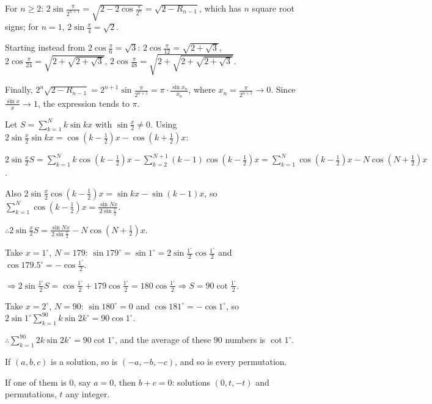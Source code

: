   For $n\geq 2$: $2\sin\frac{\pi}{2^{n + 1}} = \sqrt{2 - 2\cos\frac{\pi}{2^n}} = \sqrt{2 - R_{n - 1}}$, which has
  $n$ square root signs; for $n = 1$, $2\sin\frac{\pi}{4} = \sqrt{2}$.

  Starting instead from $2\cos\frac{\pi}{6} = \sqrt{3}$: $2\cos\frac{\pi}{12} = \sqrt{2 + \sqrt{3}}$,
  $2\cos\frac{\pi}{24} = \sqrt{2 + \sqrt{2 + \sqrt{3}}}$, $2\cos\frac{\pi}{48} = \sqrt{2 + \sqrt{2 + \sqrt{2 +
        \sqrt{3}}}}$.

  Finally, $2^n\sqrt{2 - R_{n - 1}} = 2^{n + 1}\sin\frac{\pi}{2^{n + 1}} = \pi\cdot\frac{\sin x_n}{x_n}$, where
  $x_n = \frac{\pi}{2^{n + 1}}\rightarrow 0$. Since $\frac{\sin x}{x}\rightarrow 1$, the expression tends to $\pi$.
\item Let $S = \displaystyle\sum_{k = 1}^{N}k\sin kx$ with $\sin\frac{x}{2}\neq 0$. Using $2\sin\frac{x}{2}\sin kx =
  \cos\left(k - \frac{1}{2}\right)x - \cos\left(k + \frac{1}{2}\right)x$:

  $2\sin\frac{x}{2}S = \displaystyle\sum_{k = 1}^{N}k\cos\left(k - \frac{1}{2}\right)x - \sum_{k = 2}^{N + 1}(k -
  1)\cos\left(k - \frac{1}{2}\right)x = \sum_{k = 1}^{N}\cos\left(k - \frac{1}{2}\right)x - N\cos\left(N
  + \frac{1}{2}\right)x$.

  Also $2\sin\frac{x}{2}\cos\left(k - \frac{1}{2}\right)x = \sin kx - \sin(k - 1)x$, so $\displaystyle\sum_{k =
    1}^{N}\cos\left(k - \frac{1}{2}\right)x = \frac{\sin Nx}{2\sin\frac{x}{2}}$.

  $\therefore 2\sin\frac{x}{2}S = \frac{\sin Nx}{2\sin\frac{x}{2}} - N\cos\left(N + \frac{1}{2}\right)x$.

  Take $x = 1^\circ$, $N = 179$: $\sin179^\circ = \sin1^\circ = 2\sin\frac{1^\circ}{2}\cos\frac{1^\circ}{2}$ and
  $\cos179.5^\circ = -\cos\frac{1^\circ}{2}$.

  $\Rightarrow 2\sin\frac{1^\circ}{2}S = \cos\frac{1^\circ}{2} + 179\cos\frac{1^\circ}{2} =
  180\cos\frac{1^\circ}{2}\Rightarrow S = 90\cot\frac{1^\circ}{2}$.

  Take $x = 2^\circ$, $N = 90$: $\sin180^\circ = 0$ and $\cos181^\circ = -\cos1^\circ$, so $2\sin1^\circ\displaystyle
  \sum_{k = 1}^{90}k\sin2k^\circ = 90\cos1^\circ$.

  $\therefore \displaystyle\sum_{k = 1}^{90}2k\sin2k^\circ = 90\cot1^\circ$, and the average of these $90$ numbers is
  $\cot1^\circ$.
\item If $(a, b, c)$ is a solution, so is $(-a, -b, -c)$, and so is every permutation.

  If one of them is $0$, say $a = 0$, then $b + c = 0$: solutions $(0, t, -t)$ and permutations, $t$ any
  integer.

